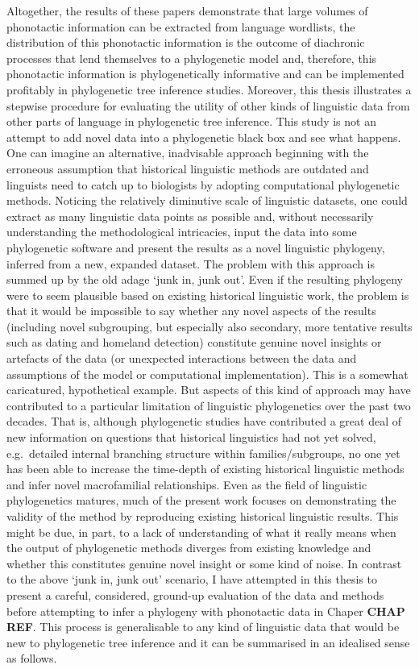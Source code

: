 Altogether, the results of these papers demonstrate that large volumes of phonotactic information can be extracted from language wordlists, the distribution of this phonotactic information is the outcome of diachronic processes that lend themselves to a phylogenetic model and, therefore, this phonotactic information is phylogenetically informative and can be implemented profitably in phylogenetic tree inference studies. Moreover, this thesis illustrates a stepwise procedure for evaluating the utility of other kinds of linguistic data from other parts of language in phylogenetic tree inference. This study is not an attempt to add novel data into a phylogenetic black box and see what happens. One can imagine an alternative, inadvisable approach beginning with the erroneous assumption that historical linguistic methods are outdated and linguists need to catch up to biologists by adopting computational phylogenetic methods. Noticing the relatively diminutive scale of linguistic datasets, one could extract as many linguistic data points as possible and, without necessarily understanding the methodological intricacies, input the data into some phylogenetic software and present the results as a novel linguistic phylogeny, inferred from a new, expanded dataset. The problem with this approach is summed up by the old adage `junk in, junk out'. Even if the resulting phylogeny were to seem plausible based on existing historical linguistic work, the problem is that it would be impossible to say whether any novel aspects of the results (including novel subgrouping, but especially also secondary, more tentative results such as dating and homeland detection) constitute genuine novel insights or artefacts of the data (or unexpected interactions between the data and assumptions of the model or computational implementation). This is a somewhat caricatured, hypothetical example. But aspects of this kind of approach may have contributed to a particular limitation of linguistic phylogenetics over the past two decades. That is, although phylogenetic studies have contributed a great deal of new information on questions that historical linguistics had not yet solved, e.g.~detailed internal branching structure within families/subgroups, no one yet has been able to increase the time-depth of existing historical linguistic methods and infer novel macrofamilial relationships. Even as the field of linguistic phylogenetics matures, much of the present work focuses on demonstrating the validity of the method by reproducing existing historical linguistic results. This might be due, in part, to a lack of understanding of what it really means when the output of phylogenetic methods diverges from existing knowledge and whether this constitutes genuine novel insight or some kind of noise. In contrast to the above `junk in, junk out' scenario, I have attempted in this thesis to present a careful, considered, ground-up evaluation of the data and methods before attempting to infer a phylogeny with phonotactic data in Chaper \textbf{CHAP REF}. This process is generalisable to any kind of linguistic data that would be new to phylogenetic tree inference and it can be summarised in an idealised sense as follows.

